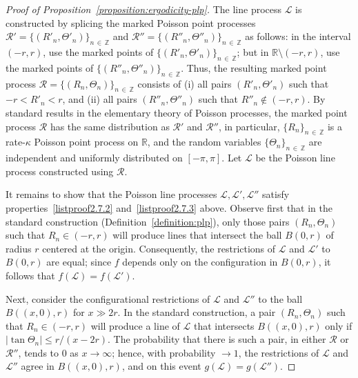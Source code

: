 \documentclass[AHL, Unicode, longabstracts, published]{cedram}
\newcommand{\zz}[1]{\mathbb #1}
\begin{document}
\begin{proof}[Proof of Proposition~\ref{proposition:ergodicity-plp}]
The line process $\mathcal{L}$ is constructed by splicing the marked Poisson point processes $\mathcal{R}'=\{(R'_{n},\Theta'_{n})\}_{n\,\in\,\zz{Z}}$ and $\mathcal{R}''=\{(R''_{n},\Theta''_{n}) \}_{n\,\in\,\zz{Z}}$ as follows: in the interval $(-r,r)$, use the marked points of $\{(R'_{n},\Theta'_{n})\}_{n\,\in\,\zz{Z}}$; but in $\zz{R}\setminus (-r,r)$, use the marked points of $\{(R''_{n},\Theta''_{n}) \}_{n\,\in\,\zz{Z}}$. Thus, the resulting marked point process $\mathcal{R}=\{(R_{n},\Theta_{n}) \}_{n\,\in\,\zz{Z}}$ consists of (i) all pairs $(R'_{n},\Theta '_{n})$ such that $-r<R'_{n}<r$, and (ii) all pairs $(R''_{n},\Theta ''_{n})$ such that $R''_{n}\not \in (-r,r)$. By standard results in the elementary theory of Poisson processes, the marked point process $\mathcal{R}$ has the same distribution as $\mathcal{R}'$ and $\mathcal{R}''$, in particular, $\{R_{n} \}_{n\,\in\, \zz{Z}}$ is a rate-$\kappa$ Poisson point process on $\zz{R}$, and the random variables $\{\Theta_{n} \}_{n\,\in\, \zz{Z}}$ are independent and uniformly distributed on $[-\pi,\pi]$. Let $\mathcal{L}$ be the Poisson line process constructed using $\mathcal{R}$.


It remains to show that the Poisson line processes $\mathcal{L},\mathcal{L}',\mathcal{L}''$ satisfy properties~\eqref{listproof2.7.2} and~\eqref{listproof2.7.3} above. Observe first that in the standard construction (Definition~\ref{definition:plp}), only those pairs $(R_{n},\Theta_{n})$ such that $R_{n}\in (-r,r)$ will produce lines that intersect the ball $B (0,r)$ of radius $r$ centered at the origin. Consequently, the restrictions of $\mathcal{L}$ and $\mathcal{L}'$ to $B (0,r)$ are equal; since $f$ depends only on the configuration in $B (0,r)$, it follows that $f (\mathcal{L})=f (\mathcal{L}')$.

Next, consider the configurational restrictions of $\mathcal{L}$ and $\mathcal{L}''$ to the ball $B ((x,0),r)$ for $x\gg 2r$. In the standard construction, a pair $(R_{n},\Theta_{n})$ such that $R_{n}\in (-r,r)$ will produce a line of $\mathcal{L}$ that intersects $B((x,0),r)$ only if $|\tan \Theta_{n}|\leq r/ (x-2r)$. The probability that there is such a pair, in either $\mathcal{R}$ or $\mathcal{R}''$, tends to $0$ as $x \rightarrow \infty$; hence, with probability $\rightarrow 1$, the restrictions of $\mathcal{L}$ and $\mathcal{L}''$ agree in $B ((x,0),r)$, and on this event $g (\mathcal{L})=g (\mathcal{L}'')$.
\end{proof}
\end{document}
